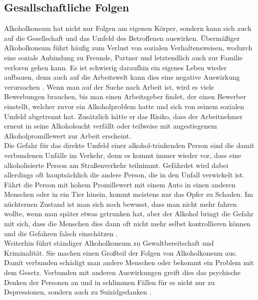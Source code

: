 \documentclass[12pt]{article}
\begin{document}
\subsection{Gesallschaftliche Folgen}                                                                                                                
Alkoholkonsum hat nicht nur Folgen am eigenen Körper, sondern kann sich auch auf die Gesellschaft und das Umfeld des Betroffenen auswirken. Übermäßiger Alkoholkonsum führt häufig zum Verlust von sozialen Verhaltensweisen, wodurch eine soziale Anbindung zu Freunde, Partner und letztendlich auch zur Familie verloren gehen kann. Es ist schwierig daraufhin ein eigenes Leben wieder aufbauen, denn auch auf die Arbeitswelt kann dies eine negative Auswirkung verursachen \autocite{burger_bundes-gesundheitssurvey_2003}. Wenn man auf der Suche nach Arbeit ist, wird es viele Bewerbungen brauchen, bis man einen Arbeitsgeber findet, der einen Bewerber einstellt, welcher zuvor ein Alkoholproblem hatte und sich von seinem sozialen Umfeld abgetrennt hat. Zusätzlich hätte er das Risiko, dass der Arbeitnehmer erneut in seine Alkoholsucht verfällt oder teilweise mit angestiegenem Alkoholpromillewert zur Arbeit erscheint. \\
Die Gefahr für das direkte Umfeld einer alkohol-trinkenden Person sind die damit verbundenen Unfälle im Verkehr, denn es kommt immer wieder vor, dass eine alkoholisierte Person am Straßenverkehr teilnimmt. Gefährdet wird dabei allerdings oft hauptsächlich die andere Person, die in den Unfall verwickelt ist. Fährt die Person mit hohem Promillewert mit einem Auto in einen anderen Menschen oder in ein Tier hinein, kommt meistens nur das Opfer zu Schaden. Im nüchternen Zustand ist man sich noch bewusst, dass man nicht mehr fahren wollte, wenn man später etwas getrunken hat, aber der Alkohol bringt die Gefahr mit sich, dass die Menschen dies dann oft nicht mehr selbst kontrollieren können und die Gefahren falsch einschätzen \autocite{burger_bundes-gesundheitssurvey_2003}. \\
Weiterhin führt ständiger Alkoholkonsum zu Gewaltbereitschaft und Kriminalität. Sie machen einen Großteil der Folgen von Alkoholkonsum aus. Damit verbunden schädigt man andere Menschen oder bekommt ein Problem mit dem Gesetz. Verbunden mit anderen Auswirkungen greift dies das psychische Denken der Personen an und in schlimmen Fällen für es nicht nur zu Depressionen, sondern auch zu Suizidgedanken \autocite{burger_bundes-gesundheitssurvey_2003}. \\
\end{document}

